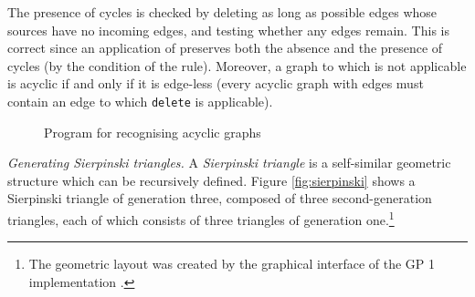 The presence of cycles is checked by deleting as long as possible edges whose sources have no incoming edges, and testing whether any edges remain. This is correct since an application of  preserves both the absence and the presence of cycles (by the condition of the rule). Moreover, a graph to which  is not applicable is acyclic if and only if it is edge-less (every acyclic graph with edges must contain an edge to which \texttt{delete} is applicable). 
\begin{figure}[htb]
\begin{center}

\end{center}
\caption{Program for recognising acyclic graphs}\label{fig:acyclicity}
\end{figure}

% 
% 
% 


\vspace{.5\baselineskip}
\noindent
\emph{Generating Sierpinski triangles.} A \emph{Sierpinski triangle} is a self-similar geometric structure which can be recursively defined. Figure \ref{fig:sierpinski} shows a Sierpinski triangle of generation three, composed of three second-generation triangles, each of which consists of three triangles of generation one.\footnote{The geometric layout was created by the graphical interface of the GP 1 implementation \cite{Manning-Plump08b}.}

